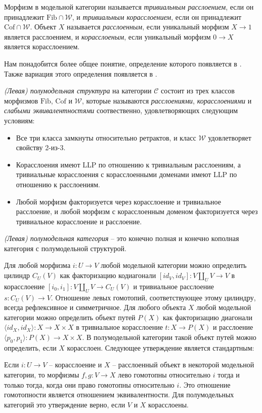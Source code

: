 \documentclass[reqno]{amsart}
\theoremstyle{definition}
\theoremstyle{remark}
\newcommand{\cat}[1]{\mathcal{#1}}
\renewcommand{\C}{\cat{C}}
\newcommand{\we}{\mathcal{W}}
\newcommand{\fib}{\mathrm{Fib}}
\newcommand{\cof}{\mathrm{Cof}}
\newcommand{\cyli}{i}
\begin{document}
Морфизм в модельной категории называется \emph{тривиальным расслоением}, если он принадлежит $\fib \cap \we$, и \emph{тривиальным корасслоением}, если он принадлежит $\cof \cap \we$.
Объект $X$ называется \emph{расслоенным}, если уникальный морфизм $X \to 1$ является расслоением, и \emph{корасслоеным}, если уникальный морфизм $0 \to X$ является корасслоением.

Нам понадобится более общее понятие, определение которого появляется в \cite{semi-model,barwick-semi}.
Также вариация этого определения появляется в \cite[Theorem~3.3]{hovey-semi}.

\begin{defn}
\emph{(Левая) полумодельная структура} на категории $\C$ состоит из трех классов морфизмов $\fib$, $\cof$ и $\we$,
которые называются \emph{расслоениями}, \emph{корасслоениями} и \emph{слабыми эквивалентностями} соотвественно, удовлетворяющих следующим условиям:
\begin{itemize}
\item Все три класса замкнуты относительно ретрактов, и класс $\we$ удовлетворяет свойству 2-из-3.
\item Корасслоения имеют LLP по отношению к тривиальным расслоениям, а тривиальные корасслоения с корасслоенными доменами имеют LLP по отношению к расслоениям.
\item Любой морфизм факторизуется через корасслоение и тривиальное расслоение, и любой морфизм с корасслоенным доменом факторизуется через тривиальное корасслоение и расслоение.
\end{itemize}
\emph{(Левая) полумодельная категория} -- это конечно полная и конечно кополная категория с полумодельной структурой.
\end{defn}

Для любой морфизма $i : U \to V$ любой модельной категории можно определить цилиндр $C_U(V)$ как факторизацию кодиагонали $[id_V,id_V] : V \amalg_U V \to V$ в корасслоение $[\cyli_0,\cyli_1] : V \amalg_U V \to C_U(V)$ и тривиальное расслоение $s : C_U(V) \to V$.
Отношение левых гомотопий, соответствующее этому цилиндру, всегда рефлексивное и симметричное.
Для любого объекта $X$ любой модельной категории можно определить объект путей $P(X)$ как факторизацию диагонали $\langle id_X, id_X \rangle : X \to X \times X$ в тривиальное корасслоение $t : X \to P(X)$ и расслоение $\langle p_0, p_1 \rangle : P(X) \to X \times X$.
В полумодельной категории такой объект путей можно определить, если $X$ корасслоен.
Следующее утверждение является стандартным:
\begin{prop}
Если $i : U \to V$ -- корасслоение и $X$ -- расслоенный объект в некоторой модельной категории, то морфизмы $f,g : V \to X$ лево гомотопны относительно $i$ тогда и только тогда, когда они право гомотопны относительно $i$.
Это отношение гомотопности является отношением эквивалентности.
Для полумодельных категорий это утверждение верно, если $V$ и $X$ корасслоены.
\end{prop}
\end{document}
